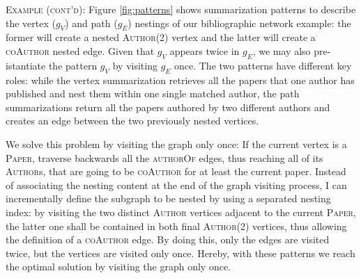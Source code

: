 \begin{em}
  \textsc{Example (cont'd)}:
	Figure \ref{fig:patterns} shows summarization patterns to describe the vertex ($g_V$) and path ($g_E$) nestings of our bibliographic network example: the former will create a nested \textsc{Author}(2) vertex and the latter will create a \textsc{coAuthor} nested edge. Given that $g_V$ appears twice in $g_E$, we may also pre-istantiate the pattern $g_V$ by visiting $g_E$ once. The two patterns have different key roles: while the vertex summarization retrieves all the papers that one author has published and nest them within one single matched author, the path summarizations return all the papers authored by two different authors and creates an edge between the two previously nested vertices. %
	
	
	We solve this problem by visiting the graph only once: %
	If the current vertex is a \textsc{Paper}, traverse backwards all the \textsc{authorOf} edges, thus reaching all of its \textsc{Author}s, that are going to be \textsc{coAuthor} for at least the current paper. Instead of associating the nesting content at the end of the graph visiting process, I can incrementally define the subgraph to be nested by using a separated nesting index: by visiting the two distinct \textsc{Author} vertices adjacent to the current \textsc{Paper}, the latter one shall be contained in both final \textsc{Author}(2) vertices, thus allowing the definition of a  \textsc{coAuthor} edge. %
	By doing this, only the edges are visited twice, but the vertices are visited only once. Hereby, with these patterns we reach the optimal solution by visiting the graph only once.
	
\end{em}



